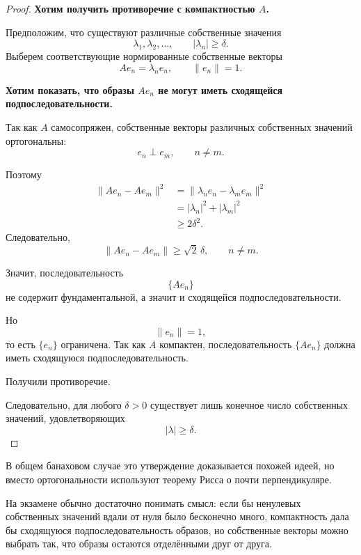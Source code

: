 \begin{proof}
	\textbf{Хотим получить противоречие с компактностью \(A\).}
	
	Предположим, что существуют различные собственные значения
	\[
	\lambda_1,\lambda_2,\ldots,
	\qquad
	|\lambda_n|\geq\delta.
	\]
	Выберем соответствующие нормированные собственные векторы
	\[
	Ae_n=\lambda_n e_n,
	\qquad
	\|e_n\|=1.
	\]
	
	\textbf{Хотим показать, что образы \(Ae_n\) не могут иметь сходящейся подпоследовательности.}
	
	Так как \(A\) самосопряжен, собственные векторы различных собственных значений
	ортогональны:
	\[
	e_n\perp e_m,
	\qquad n\neq m.
	\]
	
	Поэтому
	\[
	\begin{aligned}
		\|Ae_n-Ae_m\|^2
		&=
		\|\lambda_n e_n-\lambda_m e_m\|^2
		\\
		&=
		|\lambda_n|^2+|\lambda_m|^2
		\\
		&\geq
		2\delta^2.
	\end{aligned}
	\]
	Следовательно,
	\[
	\|Ae_n-Ae_m\|
	\geq
	\sqrt2\,\delta,
	\qquad n\neq m.
	\]
	
	Значит, последовательность
	\[
	\{Ae_n\}
	\]
	не содержит фундаментальной, а значит и сходящейся подпоследовательности.
	
	Но
	\[
	\|e_n\|=1,
	\]
	то есть \(\{e_n\}\) ограничена. Так как \(A\) компактен,
	последовательность \(\{Ae_n\}\) должна иметь сходящуюся подпоследовательность.
	
	Получили противоречие.
	
	Следовательно, для любого \(\delta>0\) существует лишь конечное число
	собственных значений, удовлетворяющих
	\[
	|\lambda|\geq\delta.
	\]
\end{proof}

\begin{remark}
	В общем банаховом случае это утверждение доказывается похожей идеей, но вместо
	ортогональности используют теорему Рисса о почти перпендикуляре.
	
	На экзамене обычно достаточно понимать смысл: если бы ненулевых собственных значений
	вдали от нуля было бесконечно много, компактность дала бы сходящуюся подпоследовательность
	образов, но собственные векторы можно выбрать так, что образы остаются отделёнными друг от друга.
\end{remark}
